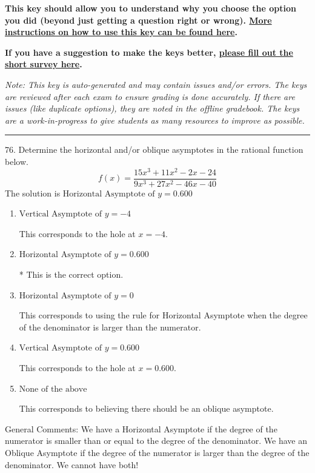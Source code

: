 \documentclass{extbook}[14pt]
\begin{document}
\textbf{This key should allow you to understand why you choose the option you did (beyond just getting a question right or wrong). \href{https://xronos.clas.ufl.edu/mac1105spring2020/courseDescriptionAndMisc/Exams/LearningFromResults}{More instructions on how to use this key can be found here}.}

\textbf{If you have a suggestion to make the keys better, \href{https://forms.gle/CZkbZmPbC9XALEE88}{please fill out the short survey here}.}

\textit{Note: This key is auto-generated and may contain issues and/or errors. The keys are reviewed after each exam to ensure grading is done accurately. If there are issues (like duplicate options), they are noted in the offline gradebook. The keys are a work-in-progress to give students as many resources to improve as possible.}

\rule{\textwidth}{0.4pt}

76. Determine the horizontal and/or oblique asymptotes in the rational function below.
\[ f(x) = \frac{15x^{3} +11 x^{2} -2 x -24}{9x^{3} +27 x^{2} -46 x -40} \] 
The solution is $ \text{Horizontal Asymptote of } y = 0.600  $ 

\begin{enumerate}[label=\Alph*.] 
\item $ \text{Vertical Asymptote of } y = -4  $ 

 This corresponds to the hole at $x = -4$. 
\item $ \text{Horizontal Asymptote of } y = 0.600  $ 

 * This is the correct option. 
\item $ \text{Horizontal Asymptote of } y = 0  $ 

 This corresponds to using the rule for Horizontal Asymptote when the degree of the denominator is larger than the numerator. 
\item $ \text{Vertical Asymptote of } y = 0.600  $ 

 This corresponds to the hole at $x = 0.600$. 
\item $ \text{None of the above} $ 

 This corresponds to believing there should be an oblique asymptote. 
\end{enumerate} 
 
General Comments: We have a Horizontal Asymptote if the degree of the numerator is smaller than or equal to the degree of the denominator. We have an Oblique Asymptote if the degree of the numerator is larger than the degree of the denominator. We cannot have both!
\end{document}
